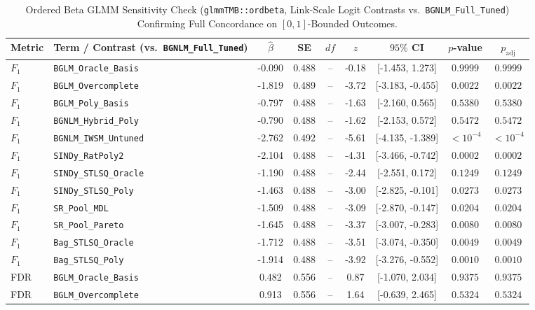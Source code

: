 \begin{table}[t]
\centering
\caption{Ordered Beta GLMM Sensitivity Check (\texttt{glmmTMB::ordbeta}, Link-Scale Logit Contrasts vs.\ \texttt{BGNLM\_Full\_Tuned}) Confirming Full Concordance on $[0,1]$-Bounded Outcomes.}
\label{tab:ordbeta_sensitivity}
\scriptsize
\setlength{\tabcolsep}{3.5pt}
\renewcommand{\arraystretch}{0.88}
\begin{tabular}{llccccccc}
\toprule
Metric & Term / Contrast (vs.\ \texttt{BGNLM\_Full\_Tuned}) & $\hat{\beta}$ & SE & $df$ & $z$ & $95\%$ CI & $p$-value & $p_{\text{adj}}$ \\
\midrule
$F_1$ & \texttt{BGLM\_Oracle\_Basis} & -0.090 & 0.488 & -- & -0.18 & [-1.453, 1.273] & $0.9999$ & $0.9999$ \\
$F_1$ & \texttt{BGLM\_Overcomplete} & -1.819 & 0.489 & -- & -3.72 & [-3.183, -0.455] & $0.0022$ & $0.0022$ \\
$F_1$ & \texttt{BGLM\_Poly\_Basis} & -0.797 & 0.488 & -- & -1.63 & [-2.160, 0.565] & $0.5380$ & $0.5380$ \\
$F_1$ & \texttt{BGNLM\_Hybrid\_Poly} & -0.790 & 0.488 & -- & -1.62 & [-2.153, 0.572] & $0.5472$ & $0.5472$ \\
$F_1$ & \texttt{BGNLM\_IWSM\_Untuned} & -2.762 & 0.492 & -- & -5.61 & [-4.135, -1.389] & $< 10^{-4}$ & $< 10^{-4}$ \\
$F_1$ & \texttt{SINDy\_RatPoly2} & -2.104 & 0.488 & -- & -4.31 & [-3.466, -0.742] & $0.0002$ & $0.0002$ \\
$F_1$ & \texttt{SINDy\_STLSQ\_Oracle} & -1.190 & 0.488 & -- & -2.44 & [-2.551, 0.172] & $0.1249$ & $0.1249$ \\
$F_1$ & \texttt{SINDy\_STLSQ\_Poly} & -1.463 & 0.488 & -- & -3.00 & [-2.825, -0.101] & $0.0273$ & $0.0273$ \\
$F_1$ & \texttt{SR\_Pool\_MDL} & -1.509 & 0.488 & -- & -3.09 & [-2.870, -0.147] & $0.0204$ & $0.0204$ \\
$F_1$ & \texttt{SR\_Pool\_Pareto} & -1.645 & 0.488 & -- & -3.37 & [-3.007, -0.283] & $0.0080$ & $0.0080$ \\
$F_1$ & \texttt{Bag\_STLSQ\_Oracle} & -1.712 & 0.488 & -- & -3.51 & [-3.074, -0.350] & $0.0049$ & $0.0049$ \\
$F_1$ & \texttt{Bag\_STLSQ\_Poly} & -1.914 & 0.488 & -- & -3.92 & [-3.276, -0.552] & $0.0010$ & $0.0010$ \\
\midrule
FDR & \texttt{BGLM\_Oracle\_Basis} & 0.482 & 0.556 & -- & 0.87 & [-1.070, 2.034] & $0.9375$ & $0.9375$ \\
FDR & \texttt{BGLM\_Overcomplete} & 0.913 & 0.556 & -- & 1.64 & [-0.639, 2.465] & $0.5324$ & $0.5324$ \\

\end{tabular}
\end{table}
